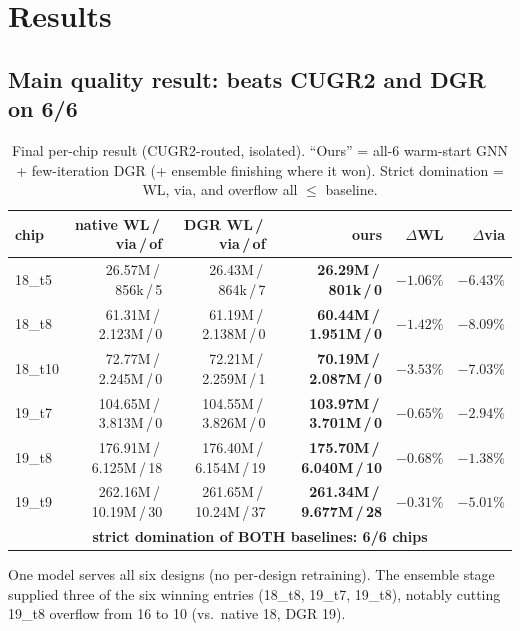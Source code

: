 \documentclass[11pt]{article}
\newcommand{\csep}{\,/\,}
\begin{document}
\section{Results}
\subsection{Main quality result: beats CUGR2 and DGR on 6/6}
\begin{table}[h]\centering\small
\caption{Final per-chip result (CUGR2-routed, isolated). ``Ours'' = all-6
warm-start GNN + few-iteration DGR (+ ensemble finishing where it won).
Strict domination = WL, via, and overflow all $\le$ baseline.}
\begin{tabular}{lrrrrr}
\toprule
chip & native WL\csep via\csep of & DGR WL\csep via\csep of & \textbf{ours} & $\Delta$WL & $\Delta$via\\
\midrule
18\_t5 & 26.57M\csep856k\csep5 & 26.43M\csep864k\csep7 & \textbf{26.29M\csep801k\csep0} & $-1.06\%$ & $-6.43\%$\\
18\_t8 & 61.31M\csep2.123M\csep0 & 61.19M\csep2.138M\csep0 & \textbf{60.44M\csep1.951M\csep0} & $-1.42\%$ & $-8.09\%$\\
18\_t10 & 72.77M\csep2.245M\csep0 & 72.21M\csep2.259M\csep1 & \textbf{70.19M\csep2.087M\csep0} & $-3.53\%$ & $-7.03\%$\\
19\_t7 & 104.65M\csep3.813M\csep0 & 104.55M\csep3.826M\csep0 & \textbf{103.97M\csep3.701M\csep0} & $-0.65\%$ & $-2.94\%$\\
19\_t8 & 176.91M\csep6.125M\csep18 & 176.40M\csep6.154M\csep19 & \textbf{175.70M\csep6.040M\csep10} & $-0.68\%$ & $-1.38\%$\\
19\_t9 & 262.16M\csep10.19M\csep30 & 261.65M\csep10.24M\csep37 & \textbf{261.34M\csep9.677M\csep28} & $-0.31\%$ & $-5.01\%$\\
\midrule
\multicolumn{6}{c}{\textbf{strict domination of BOTH baselines: 6/6 chips}}\\
\bottomrule
\end{tabular}
\end{table}
One model serves all six designs (no per-design retraining). The ensemble
stage supplied three of the six winning entries (18\_t8, 19\_t7, 19\_t8),
notably cutting 19\_t8 overflow from 16 to 10 (vs.\ native 18, DGR 19).
\end{document}

